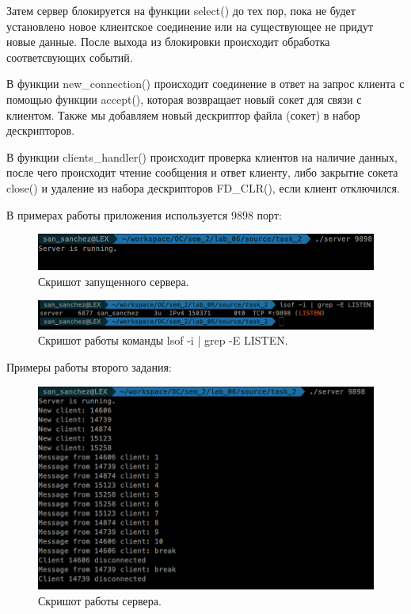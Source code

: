 Затем сервер блокируется на функции select() до тех пор, пока не будет установлено новое клиентское соединение или на существующее не придут новые данные.
После выхода из блокировки происходит обработка соответсвующих событий.

В функции new\_connection() происходит соединение в ответ на запрос клиента с помощью функции accept(), которая возвращает новый сокет для связи с клиентом. Также мы добавляем новый дескриптор файла (сокет) в набор дескрипторов.

В функции clients\_handler() происходит проверка клиентов на наличие данных, после чего происходит чтение сообщения и ответ клиенту, либо закрытие сокета close() и удаление из набора дескрипторов FD\_CLR(), если клиент отключился.

В примерах работы приложения используется 9898 порт:

\begin{figure}[H]
    \centering
    \includegraphics[scale=0.4]{data/image/cor_4.png}
    \caption{Скришот запущенного сервера.}
\end{figure}
\begin{figure}[H]
    \centering
    \includegraphics[scale=0.4]{data/image/cor_5.png}
    \caption{Скришот работы команды lsof -i | grep -E LISTEN.}
\end{figure}


Примеры работы второго задания:
\begin{figure}[H]
    \centering
    \includegraphics[scale=0.4]{data/image/server_1.png}
    \caption{Скришот работы сервера.}
\end{figure}

